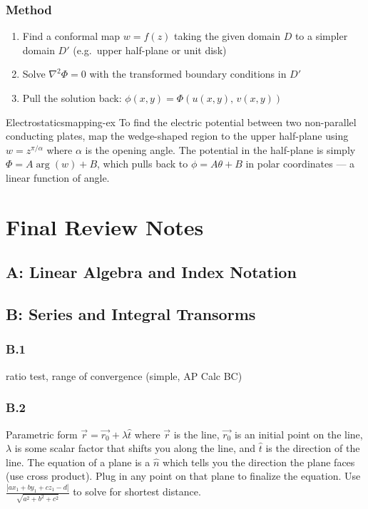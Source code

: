 \documentclass[11pt, letterpaper]{article}
\theoremstyle{plain}
\begin{document}
\subsubsection*{Method}
\begin{enumerate}[(1)]
    \item Find a conformal map $w = f(z)$ taking the given domain $D$
          to a simpler domain $D'$ (e.g.\ upper half-plane or unit disk)
    \item Solve $\nabla^2 \Phi = 0$ with the transformed boundary conditions in $D'$
    \item Pull the solution back: $\phi(x,y) = \Phi(u(x,y),\, v(x,y))$
\end{enumerate}

\begin{example}{Electrostatics}{mapping-ex}
    To find the electric potential between two non-parallel conducting plates,
    map the wedge-shaped region to the upper half-plane using $w = z^{\pi/\alpha}$
    where $\alpha$ is the opening angle. The potential in the half-plane is
    simply $\Phi = A\arg(w) + B$, which pulls back to $\phi = A\theta + B$
    in polar coordinates — a linear function of angle.
\end{example}

\newpage
\section{Final Review Notes}       %
\subsection{A: Linear Algebra and Index Notation}
\subsection{B: Series and Integral Transorms}
\subsubsection{B.1}
ratio test, range of convergence (simple, AP Calc BC)
\subsubsection{B.2}
Parametric form $\vec{r} = \vec{r_0} + \lambda \hat{t}$
where $\vec{r}$ is the line, $\vec{r_0}$ is an initial point on the line,
 $\lambda$ is some scalar factor that shifts you along the line, and $\hat{t}$ 
 is the direction of the line. The equation of a plane is a $\hat{n}$ 
 which tells you the direction the plane faces (use cross product). 
 Plug in any point on that plane to finalize the equation.
 Use $\frac{|ax_1 + by_1 + cz_1 - d|}{\sqrt{a^2 + b^2+ c^2}}$ to solve for shortest distance.
\end{document}

